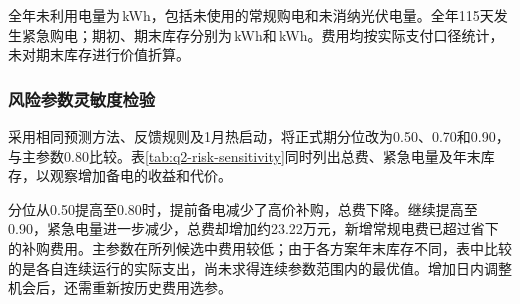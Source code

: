 全年未利用电量为\,kWh，包括未使用的常规购电和未消纳光伏电量。全年115天发生紧急购电；期初、期末库存分别为\,kWh和\,kWh。费用均按实际支付口径统计，未对期末库存进行价值折算。

\subsubsection{风险参数灵敏度检验}
采用相同预测方法、反馈规则及1月热启动，将正式期分位改为0.50、0.70和0.90，与主参数0.80比较。表\ref{tab:q2-risk-sensitivity}同时列出总费、紧急电量及年末库存，以观察增加备电的收益和代价。

\FloatBarrier
分位从0.50提高至0.80时，提前备电减少了高价补购，总费下降。继续提高至0.90，紧急电量进一步减少，总费却增加约23.22万元，新增常规电费已超过省下的补购费用。主参数在所列候选中费用较低；由于各方案年末库存不同，表中比较的是各自连续运行的实际支出，尚未求得连续参数范围内的最优值。增加日内调整机会后，还需重新按历史费用选参。
\label{end:q2}
